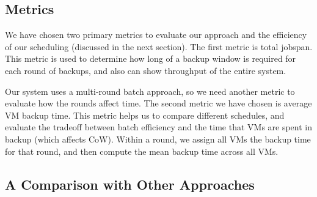 

\subsection{Metrics}
We have chosen two primary metrics to evaluate our approach and the efficiency
of our scheduling (discussed in the next section). The first metric is total
jobspan. This metric is used to determine how long of a backup window is
required for each round of backups, and also can show throughput of the entire
system.

Our system uses a multi-round batch approach, so we need another metric to
evaluate how the rounds affect time.  The second metric we have chosen is
average VM backup time. This metric helps us to compare different schedules,
and evaluate the tradeoff between batch efficiency and the time that VMs are
spent in backup (which affects CoW). Within a round, we assign all VMs the backup time
for that round, and then compute the mean backup time across all VMs.


\subsection{A Comparison with Other Approaches}

